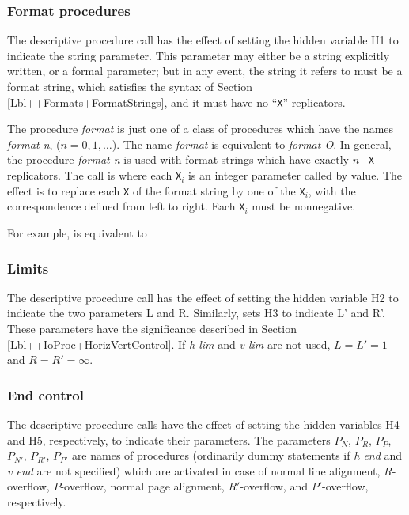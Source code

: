 \documentclass[a4paper,11pt]{article}
\begin{document}
\subsubsection{Format procedures}
\label{Lbl++IoProc+Layout+Format}

The descriptive procedure call 
\noindent{}has the effect of setting the hidden variable H1 to
indicate the string parameter. This parameter may either be a string
explicitly written, or a formal parameter; but in any event, the
string it refers to must be a format string, which satisfies the
syntax of Section \ref{Lbl++Formats+FormatStrings}, and it must have
no ``{\tt X}'' replicators.

The procedure {\it format} is just one of a class of procedures which
have the names {\it format n}, ($n = 0, 1, \dots$).  The name {\it
format} is equivalent to {\it format O}.  In general, the procedure
{\it format n} is used with format strings which have exactly $n$ {\tt
X}-replicators.  The call is
\noindent{}where each {\tt X$_i$} is an integer parameter called by
value.  The effect is to replace each {\tt X} of the format string by
one of the {\tt X$_i$}, with the correspondence defined from left to
right.  Each {\tt X$_i$} must be nonnegative.

For example,
\noindent{}is equivalent to

\subsubsection{Limits}

The descriptive procedure call
\noindent{}has the effect of setting the hidden variable H2 to
indicate the two parameters L and R. Similarly,
\noindent{}sets H3 to indicate L' and R'.  These parameters have the
significance described in Section \ref{Lbl++IoProc+HorizVertControl}.
If {\it h lim} and {\it v lim} are not used, $L = L' = 1$ and $R = R'
= \infty$.


\subsubsection{End control}
\label{Lbl++IoProc+Layout+EndControl}

The descriptive procedure calls
\noindent{}have the effect of setting the hidden variables H4 and H5,
respectively, to indicate their parameters.  The parameters $P_{N}$,
$P_{R}$, $P_{P}$, $P_{N'}$, $P_{R'}$, $P_{P'}$ are names of procedures
(ordinarily dummy statements if {\it h end} and {\it v end} are not
specified) which are activated in case of normal line alignment,
$R$-overflow, $P$-overflow, normal page alignment, $R'$-overflow, and
$P'$-overflow, respectively.
\end{document}
